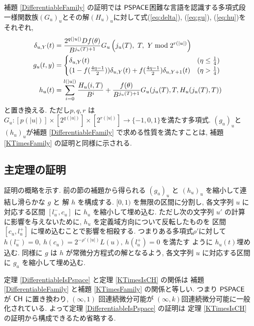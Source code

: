  補題 \ref{DifferentiableFamily} の証明では
 $\mathsf{PSPACE}$困難な言語を認識する多項式段一様関数族$(G_u)_u$とその解$(H_u)_u$に対して式(\ref{eq:delta}), (\ref{eq:gu}), (\ref{eq:hu})をそれぞれ,
 \begin{align}
  \delta_{u, Y} (t) &= \frac{2^{q(|u|)} D f(\theta)}{B^{{j_u(T)+1}}} 
   G_u\left( j_u(T),\ T,\ Y \bmod 2^{r(|u|)} \right)
  \\
  g_u(t,y) 
  &= \begin{cases}
     \delta_{u, Y}(t)
     & (\eta \le \frac 1 4)
     \\
     ( 1-f ( \frac{4\eta-1}{2})) \delta_{u, Y}(t) 
     + f ( \frac{4\eta-1}{2}) \delta_{u,Y+1}(t)
     & (\eta > \frac 1 4)
    \end{cases}
  \\
  h_u(t) &= \sum^{l(|u|)}_{i=0} \frac{H_u(i, T)}{B^{i}}  
  + \frac{f(\theta)}{B^{{j_u(T)+1}}} G_u(j_u(T), T, H_u(j_u(T), T)) 
 \end{align}
 と置き換える. ただし$p, q, r$ は $G_u \colon [p(|u|)] \times [2^{q(|u|)}] \times [2^{r(|u|)}] \to \{-1, 0, 1\}$を満たす多項式.
 $(g_u)_u$と$(h_u)_u$が補題 \ref{DifferentiableFamily} で求める性質を満たすことは,
 補題 \ref{KTimesFamily} の証明と同様に示される.


\subsection{主定理の証明}
\label{subsection: proof of theorems}

 証明の概略を示す.
 前の節の補題から得られる $(g_u)_u$ と $(h_u)_u$ を縮小して連結し滑らかな $g$ と
 解 $h$ を構成する.
 $[0,1)$ を無限の区間に分割し, 各文字列 $u$ に対応する区間
 $[l^-_u, c_u]$ に $h_u$ を縮小して埋め込む. 
 ただし次の文字列 $u'$ の計算に影響を与えないために,
 $h_u$ を定義域方向について反転したものを
 区間 $[c_u, l^+_u]$ に埋め込むことで影響を相殺する.
 つまりある多項式$\rho'$に対して
 $h(l^-_u) = 0,\ h(c_u) = 2^{-\rho'(|u|)} L(u),\ h(l^+_u) = 0$ を満たす
 ように $h_u(t)$埋め込む.
 同様に $g$ は $h$ が常微分方程式の解となるよう,
 各文字列 $u$ に対応する区間に $g_u$ を縮小して埋め込む.

 定理 \ref{DifferentiableIsPspace} と定理 \ref{KTimesIsCH} の関係は
 補題 \ref{DifferentiableFamily} と補題 \ref{KTimesFamily} の関係と等しい.
 つまり $\mathsf{PSPACE}$ が $\mathsf{CH}$ に置き換わり,
 $(\infty, 1)$ 回連続微分可能が $(\infty, k)$回連続微分可能に一般化されている.
 よって定理 \ref{DifferentiableIsPspace} の証明は
 定理 \ref{KTimesIsCH} の証明から構成できるため省略する.

